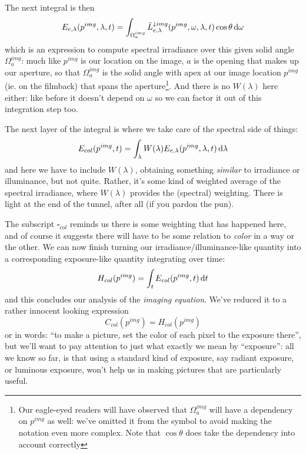 The next integral is then 
\begin{displaymath}
	E_{e,\lambda}(p^{img},\lambda,t) = \int_{\Omega^{img}_a} \bar L^{\downarrow img}_{e,\lambda}(p^{img}, \omega, \lambda, t) \cos\theta \mathop{}\!\mathrm{d}\omega
\end{displaymath}
which is an expression to compute \gls{spectral} \gls{irradiance} over this given
solid angle $\Omega^{img}_a$: much like $p^{img}$ is our location on the image, 
$a$ is the opening that makes up our aperture, so that 
$\Omega^{img}_a$ is the solid angle with apex at our image location $p^{img}$ (ie. on the filmback) 
that spans the aperture\footnote{
	Our eagle-eyed readers will have observed that $\Omega^{img}_a$ will have a dependency 
	on $p^{img}$ as well: we've omitted it from the symbol to avoid making the notation even 
	more complex. Note that $\cos\theta$ does take the dependency into account correctly}.
And there is no $W(\lambda)$ here either: like before it doesn't depend on $\omega$ so 
we can factor it out of this integration step too.

The next layer of the integral is where we take care of the \gls{spectral} side of things:
\begin{displaymath}
	E_{col}(p^{img}, t) = \int_{\lambda} W(\lambda) E_{e,\lambda}(p^{img},\lambda,t) \mathop{}\!\mathrm{d}\lambda
\end{displaymath}
and here we have to include $W(\lambda)$, obtaining something \emph{similar} to \gls{irradiance} or
\gls{illuminance}, but not quite. Rather, it's some kind of weighted average of the spectral
irradiance, where $W(\lambda)$ provides the (spectral) weighting. 
There is light at the end of the tunnel, after all (if you pardon the pun). 

The subscript $\square_{col}$ reminds us there is some weighting that has happened here, 
and of course it suggests there will have to be some relation to \emph{color} in a way or the 
other.
We can now finish turning our \gls{irradiance}/\gls{illuminance}-like quantity into 
a corresponding \gls{exposure}-like quantity integrating over time:
\begin{displaymath}
	H_{col}(p^{img}) = \int_t E_{col}(p^{img},t) \mathop{}\!\mathrm{d} t
\end{displaymath}
and this concludes our analysis of the \textsl{imaging equation}. 
We've reduced it to a rather innocent looking expression
\begin{displaymath}
 	C_{col}(p^{img}) = H_{col}(p^{img})
\end{displaymath}
or in words: ``to make a picture, set the color of each pixel to the exposure there'', 
but we'll want to pay attention to just what exactly we mean by ``exposure'': 
all we know so far, is that using a standard kind of exposure, say radiant exposure, or
luminous exposure, won't help us in making pictures that are particularly useful.

